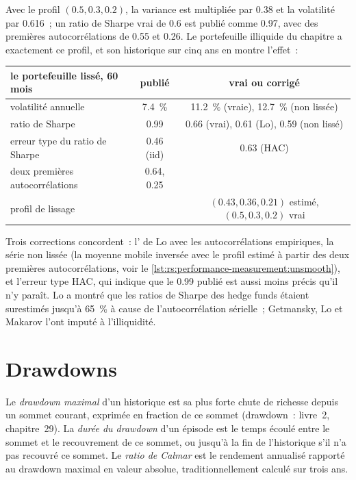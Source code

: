 Avec le profil $(0.5, 0.3, 0.2)$, la variance est multipliée par 0.38 et la volatilité par 0.616~; un ratio de Sharpe vrai de 0.6 est publié comme 0.97, avec
des premières autocorrélations de 0.55 et 0.26. Le portefeuille illiquide du chapitre a exactement ce profil, et son historique sur cinq ans en montre l'effet~:

\begin{center}
\small
\begin{tabular}{@{}lcc@{}}
\toprule
le portefeuille lissé, 60 mois & publié & vrai ou corrigé\\
\midrule
volatilité annuelle & 7.4~\% & 11.2~\% (vraie), 12.7~\% (non lissée)\\
ratio de Sharpe & 0.99 & 0.66 (vrai), 0.61 (Lo), 0.59 (non lissé)\\
erreur type du ratio de Sharpe & 0.46 (iid) & 0.63 (HAC)\\
deux premières autocorrélations & 0.64, 0.25 & \\
profil de lissage & & $(0.43, 0.36, 0.21)$ estimé, $(0.5, 0.3, 0.2)$ vrai\\
\bottomrule
\end{tabular}
\end{center}

Trois corrections concordent~: l' de Lo avec les autocorrélations empiriques, la série non lissée (la moyenne mobile inversée avec le profil estimé
à partir des deux premières autocorrélations, voir le \cref{lst:rs:performance-measurement:unsmooth}), et l'erreur type HAC, qui indique que le 0.99 publié est aussi
moins précis qu'il n'y paraît. Lo a montré que les ratios de Sharpe des hedge funds étaient surestimés jusqu'à 65~\% à cause de l'autocorrélation sérielle~; Getmansky, Lo et
Makarov l'ont imputé à l'illiquidité.

\section{Drawdowns}

\begin{definition}\label{def:rs:performance-measurement:drawdown}
Le \emph{drawdown maximal} d'un historique est sa plus forte chute de richesse depuis un sommet courant, exprimée en fraction de ce sommet (drawdown~: livre~2,
chapitre~29). La \emph{durée du drawdown} d'un épisode est le temps écoulé entre le sommet et le recouvrement de ce sommet, ou jusqu'à la fin de
l'historique s'il n'a pas recouvré ce sommet. Le \emph{ratio de Calmar} est le rendement annualisé rapporté au drawdown maximal en valeur absolue, traditionnellement calculé sur trois ans.
\end{definition}

